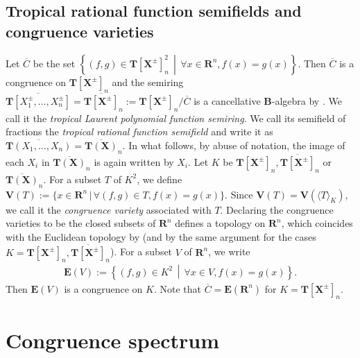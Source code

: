 \documentclass[a4paper,12pt]{amsart}
\theoremstyle{plain}
\theoremstyle{definition}
\begin{document}
\subsection{Tropical rational function semifields and congruence varieties}
	\label{subsection2.4}

Let $\overline{C}$ be the set $    \left\{ (f, g) \in \boldsymbol{T}[\boldsymbol{X}^{\pm}]_n^2 \,\middle|\, \forall x \in \boldsymbol{R}^n, f(x) = g(x) \right\}$.
Then $\overline{C}$ is a congruence on $\boldsymbol{T}[\boldsymbol{X}^{\pm}]_n$ and the semiring $\overline{\boldsymbol{T}[X_1^{\pm}, \ldots, X_n^{\pm}]} = \overline{\boldsymbol{T}[\boldsymbol{X}^{\pm}]}_n := \boldsymbol{T}[\boldsymbol{X}^{\pm}]_n / \overline{C}$ is a cancellative $\boldsymbol{B}$-algebra by \cite[Lemma~4.3]{Nakajima=Song}.
We call it the \textit{tropical Laurent polynomial function semiring}.
We call its semifield of fractions the \textit{tropical rational function semifield} and write it as $\overline{\boldsymbol{T}(X_1, \ldots, X_n)} = \overline{\boldsymbol{T}(\boldsymbol{X})}_n$.
In what follows, by abuse of notation, the image of each $X_i$ in $\overline{\boldsymbol{T}(\boldsymbol{X})}_n$ is again written by $X_i$.
Let $K$ be $\boldsymbol{T}[\boldsymbol{X}^{\pm}]_n, \overline{\boldsymbol{T}[\boldsymbol{X}^{\pm}]}_n$ or $\overline{\boldsymbol{T}(\boldsymbol{X})}_n$.
For a subset $T$ of $K^2$, we define $\boldsymbol{V}(T) := \{ x \in \boldsymbol{R}^n \,|\, \forall (f, g) \in T, f(x) = g(x)\}$.
Since $\boldsymbol{V}(T) = \boldsymbol{V}(\langle T \rangle_K)$, we call it the \textit{congruence variety} associated with $T$.
Declaring the congruence varieties to be the closed subsets of
$\boldsymbol{R}^n$ defines a topology on $\boldsymbol{R}^n$,
which coincides with the Euclidean topology by
\cite[Proposition~3.8]{JuAe5} (and by the same argument for the cases $K = \boldsymbol{T}[\boldsymbol{X}^{\pm}]_n, \overline{\boldsymbol{T}[\boldsymbol{X}^{\pm}]}_n$).
For a subset $V$ of $\boldsymbol{R}^n$, we write
\begin{align*}
\boldsymbol{E}(V) := \left\{ (f, g) \in K^2 \,\middle|\, \forall x \in V, f(x) = g(x) \right\}.
\end{align*}
Then $\boldsymbol{E}(V)$ is a congruence on $K$.
Note that $\overline{C} = \boldsymbol{E}(\boldsymbol{R}^n)$ for $K = \boldsymbol{T}[\boldsymbol{X}^{\pm}]_n$.

\section{Congruence spectrum}
    \label{section3}
\end{document}
